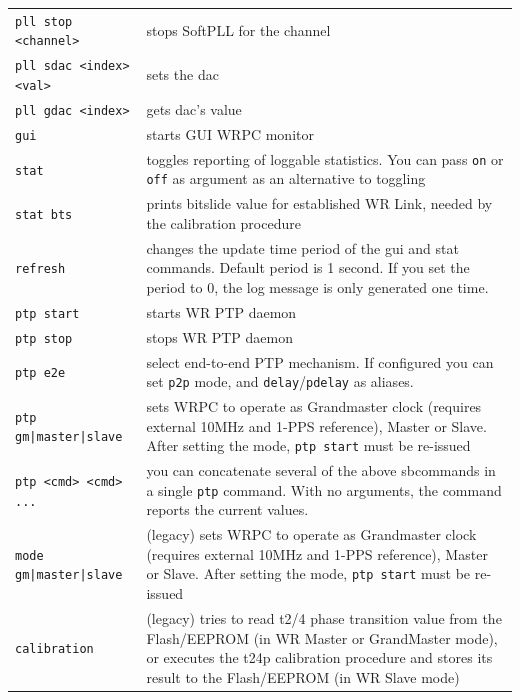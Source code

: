 \documentclass[a4paper, 12pt]{article}
\newcommand{\code}[1]{\texttt{#1}}
\begin{document}
\begin{longtable}{  p{7.5cm}  p{7cm} }
  \code{pll stop <channel>} & stops SoftPLL for the channel\\

  \code{pll sdac <index> <val>} & sets the dac\\

  \code{pll gdac <index>} & gets dac's value\\

  \code{gui} & starts GUI WRPC monitor\\

  \code{stat} & toggles reporting of loggable statistics. You can pass
\texttt{on} or \texttt{off} as argument as an alternative to toggling\\

  \code{stat bts} & prints bitslide value for established WR Link,
needed by the calibration procedure\\

  \code{refresh} & changes the update time period of the gui and stat
commands. Default period is 1 second. If you set the period to 0, the log
message is only generated one time.\\

  \code{ptp start} & starts WR PTP daemon\\

  \code{ptp stop} & stops WR PTP daemon\\

  \code{ptp e2e} & select end-to-end PTP mechanism. If configured you can set \texttt{p2p} mode, and \texttt{delay}/\texttt{pdelay} as aliases.\\

  \code{ptp gm|master|slave} & sets WRPC to operate as Grandmaster
clock (requires external 10MHz and 1-PPS reference), Master or Slave. After
setting the mode, \texttt{ptp start} must be re-issued\\

  \code{ptp <cmd> <cmd> ...} & you can concatenate several of the above sbcommands in a single \texttt{ptp} command. With no arguments, the command reports the current values.\\

\code{mode gm|master|slave} & (legacy) sets WRPC to operate as Grandmaster
clock (requires external 10MHz and 1-PPS reference), Master or Slave. After
setting the mode, \texttt{ptp start} must be re-issued\\

  \code{calibration} & (legacy) tries to read t2/4 phase transition value from the
Flash/EEPROM (in WR Master or GrandMaster mode), or executes the t24p
calibration procedure and stores its result to the Flash/EEPROM (in WR 
Slave mode)\\


\end{longtable}
\end{document}
